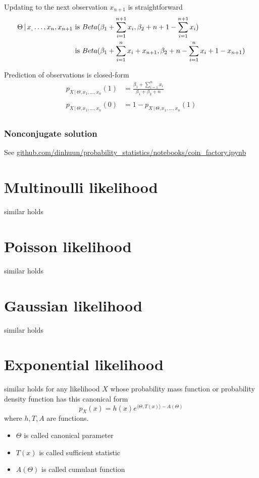 \documentclass[14pt, reqno]{amsart}
\theoremstyle{definition}
\begin{document}
Updating to the next observation $x_{n+1}$ is straightforward
\begin{align*}
\Theta \,|\, x_, \dots, x_n, x_{n+1} & \text{ is } Beta(\beta_1 + \sum \limits _{i=1}^{n+1} x_i, \beta_2  + n + 1 - \sum \limits _{i=1}^{n + 1} x_i) \\
 & \textnormal{ is } Beta(\beta_1 + \sum \limits _{i=1}^n x_i + x_{n + 1}, \beta_2  + n - \sum \limits _{i=1}^n x_i + 1 - x_{n + 1}) \\
\end{align*}

Prediction of observations is closed-form
\begin{align*}
p_{X \,|\, \Theta, x_1, \dots, x_n} (1) & = \frac{\beta_1 + \sum \limits _{i=1}^n x_i}{\beta_1 + \beta_2 + n} \\
\\
p_{X \,|\, \Theta, x_1, \dots, x_n} (0) & = 1 - p_{X \,|\, \Theta, x_1, \dots, x_n} (1) \\
\end{align*}

\subsubsection{Nonconjugate solution} See
\newline
\href{https://github.com/dinhuun/probability_statistics/tree/master/notebooks/coin_factory.ipynb}{github.com/dinhuun/probability\_statistics/notebooks/coin\_factory.ipynb}

\section{Multinoulli likelihood} similar holds

\section{Poisson likelihood} similar holds

\section{Gaussian likelihood} similar holds

\section{Exponential likelihood} similar holds for any likelihood $X$ whose probability mass function or probability density function has this canonical form
$$p_X(x) = h(x) e^{\langle \Theta, T(x) \rangle - A(\Theta)}$$
where $h, T, A$ are functions.
\begin{itemize}
\item $\Theta$ is called canonical parameter
\item $T(x)$ is called sufficient statistic
\item $A(\Theta)$ is called cumulant function
\end{itemize}
\end{document}

